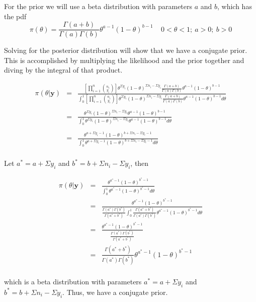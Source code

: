 \documentclass[12pt]{article}
\begin{document}
\noindent For the prior we will use a beta distribution with parameters $a$ and $b$, which has the pdf
\[\pi(\theta)=\frac{\Gamma(a+b)}{\Gamma(a)\Gamma(b)}\theta^{a-1}(1-\theta)^{b-1}\ \ \ \ \ 0<\theta<1;\ a>0;\ b>0 \]

\noindent Solving for the posterior distribution will show that we have a conjugate prior.  This is accomplished by multiplying the likelihood and the prior together and diving by the integral of that product.

\begin{eqnarray*}
\pi(\theta|\mathbf{y}) &=& \frac{\left[\prod_{i=1}^n{n_i \choose y_i}\right]\theta^{\Sigma y_i}(1-\theta)^{\Sigma n_i-\Sigma y_i}\frac{\Gamma(a+b)}{\Gamma(a)\Gamma(b)}\theta^{a-1}(1-\theta)^{b-1}}{\int_0^1\left[\prod_{i=1}^n{n_i \choose y_i}\right]\theta^{\Sigma y_i}(1-\theta)^{\Sigma n_i-\Sigma y_i}\frac{\Gamma(a+b)}{\Gamma(a)\Gamma(b)}\theta^{a-1}(1-\theta)^{b-1}d\theta}  \\
\\
&=& \frac{\theta^{\Sigma y_i}(1-\theta)^{\Sigma n_i-\Sigma y_i}\theta^{a-1}(1-\theta)^{b-1}}{\int_0^1\theta^{\Sigma y_i}(1-\theta)^{\Sigma n_i-\Sigma y_i}\theta^{a-1}(1-\theta)^{b-1}d\theta} \\
\\
&=& \frac{\theta^{a+\Sigma y_i-1}(1-\theta)^{b+\Sigma n_i-\Sigma y_i-1}}{\int_0^1\theta^{a+\Sigma y_i-1}(1-\theta)^{b+\Sigma n_i-\Sigma y_i-1}d\theta} \\
\end{eqnarray*}

\noindent Let $a^*=a+\Sigma y_i$ and $b^*=b+\Sigma n_i-\Sigma y_i$, then

\begin{eqnarray*}
\pi(\theta|\mathbf{y}) &=& \frac{\theta^{a^*-1}(1-\theta)^{b^*-1}}{\int_0^1\theta^{a^*-1}(1-\theta)^{b^*-1}d\theta} \\
&=& \frac{\theta^{a^*-1}(1-\theta)^{b^*-1}}{\frac{\Gamma(a^*)\Gamma(b^*)}{\Gamma(a^*+b^*)}\int_0^1\frac{\Gamma(a^*+b^*)}{\Gamma(a^*)\Gamma(b^*)}\theta^{a^*-1}(1-\theta)^{b^*-1}d\theta} \\
&=& \frac{\theta^{a^*-1}(1-\theta)^{b^*-1}}{\frac{\Gamma(a^*)\Gamma(b^*)}{\Gamma(a^*+b^*)}} \\
&=& \frac{\Gamma(a^*+b^*)}{\Gamma(a^*)\Gamma(b^*)}\theta^{a^*-1}(1-\theta)^{b^*-1} \\
\end{eqnarray*}

\noindent which is a beta distribution with parameters $a^*=a+\Sigma y_i$ and $b^*=b+\Sigma n_i-\Sigma y_i$.  Thus, we have a conjugate prior.
\end{document}
